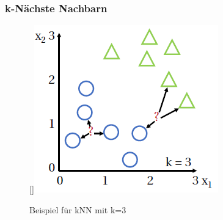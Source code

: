 \subsubsection{k-Nächste Nachbarn}
\label{subsubsec_KNN}
\begin{figure}
    \centering
    \raisebox{0pt}[\dimexpr{}\baselineskip\relax]{\includegraphics[scale=0.7]{pic/MA-Bilder/k-naechste-Nachbarn.PNG}}
    \caption{Beispiel für kNN mit k=3 \cite{Matzka.2021}}
    \label{Fig:knearest}
\end{figure}

